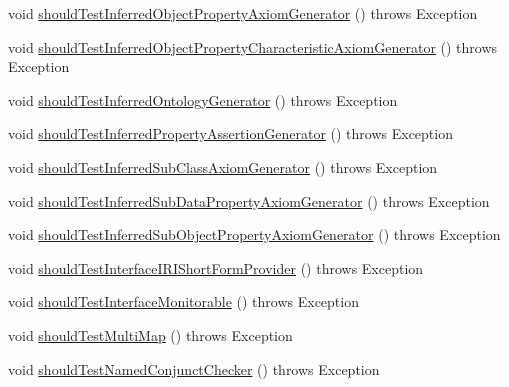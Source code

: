 \begin{DoxyCompactItemize}
void \hyperlink{classorg_1_1semanticweb_1_1owlapi_1_1contract_1_1_contract_owlapi_util_test_a1e28fb56e40957881b8a03bed2d0f715}{should\-Test\-Inferred\-Object\-Property\-Axiom\-Generator} ()  throws Exception 
\item 
void \hyperlink{classorg_1_1semanticweb_1_1owlapi_1_1contract_1_1_contract_owlapi_util_test_a04f2b0488fe07db6ef612009f6785db9}{should\-Test\-Inferred\-Object\-Property\-Characteristic\-Axiom\-Generator} ()  throws Exception 
\item 
void \hyperlink{classorg_1_1semanticweb_1_1owlapi_1_1contract_1_1_contract_owlapi_util_test_a3c639a8978a3de126edae213e96bd254}{should\-Test\-Inferred\-Ontology\-Generator} ()  throws Exception 
\item 
void \hyperlink{classorg_1_1semanticweb_1_1owlapi_1_1contract_1_1_contract_owlapi_util_test_a15ceebd852320e524f45e15b8b3031a3}{should\-Test\-Inferred\-Property\-Assertion\-Generator} ()  throws Exception 
\item 
void \hyperlink{classorg_1_1semanticweb_1_1owlapi_1_1contract_1_1_contract_owlapi_util_test_aa29d5222bb4242336696775b2e4549c9}{should\-Test\-Inferred\-Sub\-Class\-Axiom\-Generator} ()  throws Exception 
\item 
void \hyperlink{classorg_1_1semanticweb_1_1owlapi_1_1contract_1_1_contract_owlapi_util_test_aba238b30de12c143acb8536256aaad56}{should\-Test\-Inferred\-Sub\-Data\-Property\-Axiom\-Generator} ()  throws Exception 
\item 
void \hyperlink{classorg_1_1semanticweb_1_1owlapi_1_1contract_1_1_contract_owlapi_util_test_a9c3b160df59b81f6c2ed4a5186bcb945}{should\-Test\-Inferred\-Sub\-Object\-Property\-Axiom\-Generator} ()  throws Exception 
\item 
void \hyperlink{classorg_1_1semanticweb_1_1owlapi_1_1contract_1_1_contract_owlapi_util_test_ab88dd638b181dcf94c93b9b89d3b4128}{should\-Test\-Interface\-I\-R\-I\-Short\-Form\-Provider} ()  throws Exception 
\item 
void \hyperlink{classorg_1_1semanticweb_1_1owlapi_1_1contract_1_1_contract_owlapi_util_test_afc4e5961f718db04489cec96b2a59b0a}{should\-Test\-Interface\-Monitorable} ()  throws Exception 
\item 
void \hyperlink{classorg_1_1semanticweb_1_1owlapi_1_1contract_1_1_contract_owlapi_util_test_ad845c3c1bbfb76aae109b6a51ccbc94b}{should\-Test\-Multi\-Map} ()  throws Exception 
\item 
void \hyperlink{classorg_1_1semanticweb_1_1owlapi_1_1contract_1_1_contract_owlapi_util_test_ab93ca2bb242a1d41ff063edd728678a1}{should\-Test\-Named\-Conjunct\-Checker} ()  throws Exception 

\end{DoxyCompactItemize}
